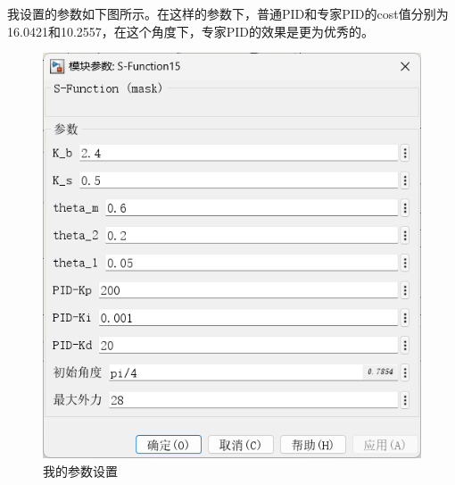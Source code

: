 \documentclass[12pt,a4paper,UTF8]{article}
\begin{document}
我设置的参数如下图所示。在这样的参数下，普通PID和专家PID的cost值分别为16.0421和10.2557，在这个角度下，专家PID的效果是更为优秀的。


\begin{figure}[htbp]
    \centering
    \includegraphics[width=0.4\linewidth]{figures/parameter_pi4.png}
    \caption{我的参数设置}
\end{figure}
\end{document}
